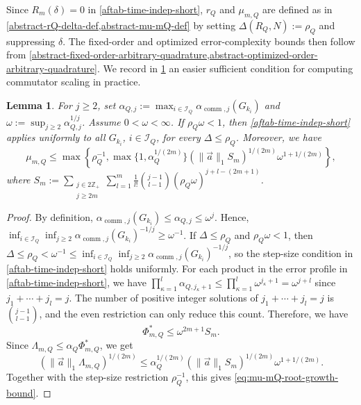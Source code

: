 \documentclass[10pt,reqno]{article}
\numberwithin{equation}{section}
\theoremstyle{plain}
\newtheorem{lem}[thm]{Lemma}
\theoremstyle{definition}
\begin{document}
Since \(R_m(\delta)=0\) in \cref{aftab-time-indep-short}, \(r_Q\) and \(\mu_{m,Q}\) are defined as in \cref{abstract-rQ-delta-def,abstract-mu-mQ-def} by setting \(\Delta(R_Q,N):=\rho_Q\) and suppressing \(\delta\).  The fixed-order and optimized error-complexity bounds then follow from \cref{abstract-fixed-order-arbitrary-quadrature,abstract-optimized-order-arbitrary-quadrature}. We record in \cref{lem:simplified-root-growth-scale} an easier sufficient condition for computing commutator scaling in practice.

\begin{lem}\label{lem:simplified-root-growth-scale}
For \(j\geq2\), set $\alpha_{Q,j}:=\max_{i\in\mathcal I_Q}\alpha_{\operatorname{comm},j}(G_{k_i})$ and $\omega:=\sup_{j\geq2}\alpha_{Q,j}^{1/j}$. Assume \(0<\omega<\infty\). If \(\rho_Q\omega<1\), then \cref{aftab-time-indep-short} applies uniformly to all \(G_{k_i}\), \(i\in\mathcal I_Q\), for every \(\Delta\leq\rho_Q\).
Moreover, we have
\begin{equation}\label{eq:mu-mQ-root-growth-bound}
\mu_{m,Q} \leq \max\left\{ \rho_Q^{-1}, \max\{1,\alpha_Q^{1/(2m)}\} (\|\vec a\|_1S_m)^{1/(2m)} \omega^{1+1/(2m)} \right\}, \end{equation}
where $S_m:=\sum_{\substack{j\in2\mathbb Z_+\\ j\geq2m}} \sum_{l=1}^{m} \frac{1}{l!}\binom{j-1}{l-1}(\rho_Q \omega)^{j+l-(2m+1)}$.  
\end{lem}

\begin{proof}
By definition, \(\alpha_{\operatorname{comm},j}(G_{k_i})\leq\alpha_{Q,j}\leq\omega^j\). Hence,  $\inf_{i\in\mathcal I_Q}\inf_{j\geq2} \alpha_{\operatorname{comm},j}(G_{k_i})^{-1/j} \geq \omega^{-1}$. If \(\Delta\leq\rho_Q\) and \(\rho_Q\omega<1\), then $\Delta\leq\rho_Q<\omega^{-1} \leq \inf_{i\in\mathcal I_Q}\inf_{j\geq2} \alpha_{\operatorname{comm},j}(G_{k_i})^{-1/j}$, 
so the step-size condition in \cref{aftab-time-indep-short} holds uniformly. For each product in the error profile in \cref{aftab-time-indep-short}, we have 
$\prod_{\kappa=1}^{l}\alpha_{Q,j_\kappa+1} \leq \prod_{\kappa=1}^{l}\omega^{j_\kappa+1} = \omega^{j+l}$ since \(j_1+\cdots+j_l=j\). The number of positive integer solutions of \(j_1+\cdots+j_l=j\) is \(\binom{j-1}{l-1}\), and the even restriction can only reduce this count. Therefore, we have 
\begin{equation}
\Phi_{m,Q}^{\ast}\leq \omega^{2m+1}S_m.
\end{equation}
Since \(\Lambda_{m,Q}\leq\alpha_Q\Phi_{m,Q}^{\ast}\), we get
\begin{equation}
(\|\vec a\|_1\Lambda_{m,Q})^{1/(2m)} \leq \alpha_Q^{1/(2m)} (\|\vec a\|_1S_m)^{1/(2m)} \omega^{1+1/(2m)}.
\end{equation}
Together with the step-size restriction \(\rho_Q^{-1}\), this gives \eqref{eq:mu-mQ-root-growth-bound}. 
\end{proof}
\end{document}
